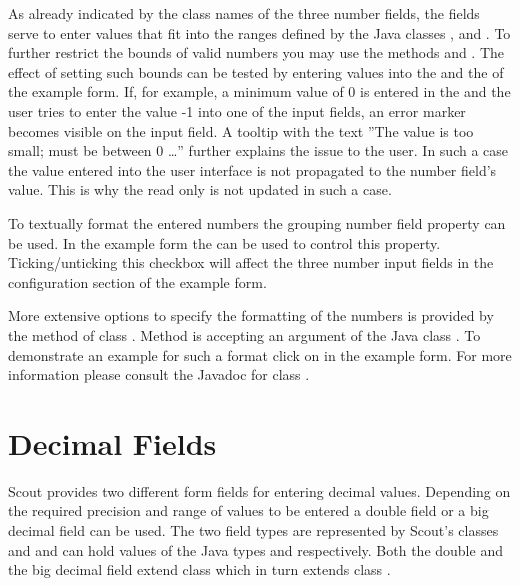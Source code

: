 \documentclass[a4paper,10pt,twoside]{book}
\begin{document}
{As already indicated by the class names of the three number fields, the fields serve to enter values that fit into the ranges defined by the Java classes ,  and .
To further restrict the bounds of valid numbers you may use the methods  and .
The effect of setting such bounds can be tested by entering values into the  and the  of the example form.
If, for example, a minimum value of 0 is entered in the  and the user tries to enter the value -1 into one of the input fields, an error marker becomes visible on the input field. 
A tooltip with the text ''The value is too small; must be between 0 \dots'' further explains the issue to the user.
In such a case the value entered into the user interface is not propagated to the number field's value.
This is why the read only  is not updated in such a case.

To textually format the entered numbers the grouping number field property can be used. 
In the example form the  can be used to control this property.
Ticking/unticking this checkbox will affect the three number input fields in the configuration section of the example form.

More extensive options to specify the formatting of the numbers is provided by the method  of class . 
Method  is accepting an argument of the Java class . 
To demonstrate an example for such a format click on  in the example form. 
For more information please consult the Javadoc for class .

\section{Decimal Fields}

Scout provides two different form fields for entering decimal values. 
Depending on the required precision and range of values to be entered a double field or a big decimal field can be used. 
The two field types are represented by Scout's classes  and  and can hold values of the Java types  and  respectively. 
Both the double and the big decimal field extend class  which in turn extends class .

}
\end{document}
